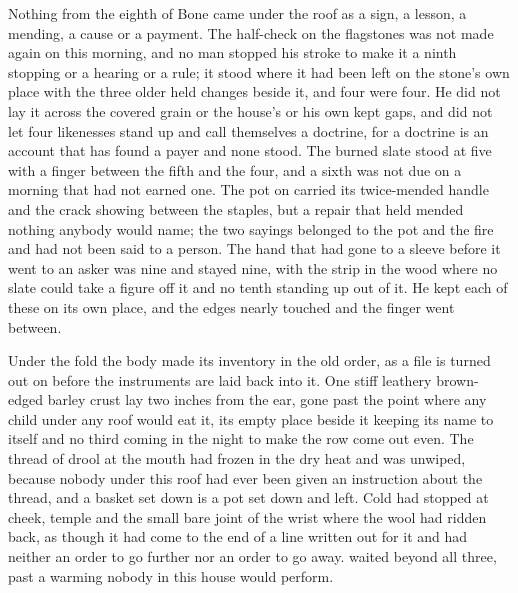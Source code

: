 Nothing from the eighth of Bone came under the roof as a sign, a lesson, a mending, a cause or a payment. The half-check on the flagstones was not made again on this morning, and no man stopped his stroke to make it a ninth stopping or a hearing or a rule; it stood where it had been left on the stone's own place with the three older held changes beside it, and four were four. He did not lay it across the covered grain or the house's  or his own kept gaps, and did not let four likenesses stand up and call themselves a doctrine, for a doctrine is an account that has found a payer and none stood. The burned slate stood at five with a finger between the fifth and the four, and a sixth was not due on a morning that had not earned one. The pot on  carried its twice-mended handle and the crack showing between the staples, but a repair that held mended nothing anybody would name; the two sayings belonged to the pot and the fire and had not been said to a person. The hand that had gone to a sleeve before it went to an asker was nine and stayed nine, with the strip in the wood where no slate could take a figure off it and no tenth standing up out of it. He kept each of these on its own place, and the edges nearly touched and the finger went between.

Under the fold the body made its inventory in the old order, as a file is turned out on  before the instruments are laid back into it. One stiff leathery brown-edged barley crust lay two inches from the ear, gone past the point where any child under any roof would eat it, its empty place beside it keeping its name to itself and no third coming in the night to make the row come out even. The thread of drool at the mouth had frozen in the dry heat and was unwiped, because nobody under this roof had ever been given an instruction about the thread, and a basket set down is a pot set down and left. Cold had stopped at cheek, temple and the small bare joint of the wrist where the wool had ridden back, as though it had come to the end of a line written out for it and had neither an order to go further nor an order to go away.  waited beyond all three, past a warming nobody in this house would perform.

